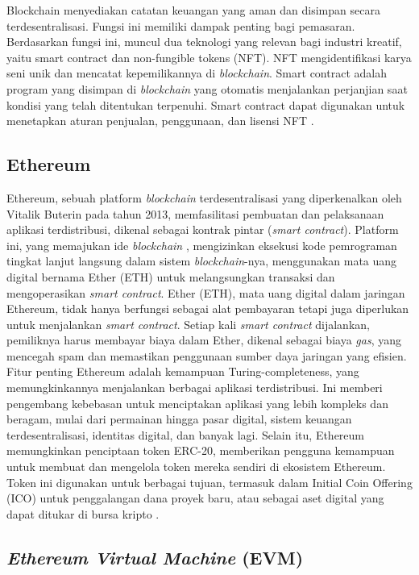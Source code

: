 Blockchain menyediakan catatan keuangan yang aman dan disimpan secara terdesentralisasi. Fungsi ini memiliki dampak penting bagi pemasaran. Berdasarkan fungsi ini, muncul dua teknologi yang relevan bagi industri kreatif, yaitu smart contract dan non-fungible tokens (NFT). NFT mengidentifikasi karya seni unik dan mencatat kepemilikannya di \emph{blockchain}. Smart contract adalah program yang disimpan di \emph{blockchain} yang otomatis menjalankan perjanjian saat kondisi yang telah ditentukan terpenuhi. Smart contract dapat digunakan untuk menetapkan aturan penjualan, penggunaan, dan lisensi NFT \parencite{Malik2023}.

\subsection{Ethereum}

Ethereum, sebuah platform \emph{blockchain} terdesentralisasi yang diperkenalkan oleh Vitalik Buterin pada tahun 2013, memfasilitasi pembuatan dan pelaksanaan aplikasi terdistribusi, dikenal sebagai kontrak pintar (\emph{smart contract}). Platform ini, yang memajukan ide \emph{blockchain} , mengizinkan eksekusi kode pemrograman tingkat lanjut langsung dalam sistem \emph{blockchain}-nya, menggunakan mata uang digital bernama Ether (ETH) untuk melangsungkan transaksi dan mengoperasikan \emph{smart contract}. Ether (ETH), mata uang digital dalam jaringan Ethereum, tidak hanya berfungsi sebagai alat pembayaran tetapi juga diperlukan untuk menjalankan \emph{smart contract}. Setiap kali \emph{smart contract} dijalankan, pemiliknya harus membayar biaya dalam Ether, dikenal sebagai biaya \emph{gas}, yang mencegah spam dan memastikan penggunaan sumber daya jaringan yang efisien. Fitur penting Ethereum adalah kemampuan Turing-completeness, yang memungkinkannya menjalankan berbagai aplikasi terdistribusi. Ini memberi pengembang kebebasan untuk menciptakan aplikasi yang lebih kompleks dan beragam, mulai dari permainan hingga pasar digital, sistem keuangan terdesentralisasi, identitas digital, dan banyak lagi. Selain itu, Ethereum memungkinkan penciptaan token ERC-20, memberikan pengguna kemampuan untuk membuat dan mengelola token mereka sendiri di ekosistem Ethereum. Token ini digunakan untuk berbagai tujuan, termasuk dalam Initial Coin Offering (ICO) untuk penggalangan dana proyek baru, atau sebagai aset digital yang dapat ditukar di bursa kripto \parencite{Antonopoulos2018}.

\subsection{\emph{Ethereum Virtual Machine} (EVM)}

